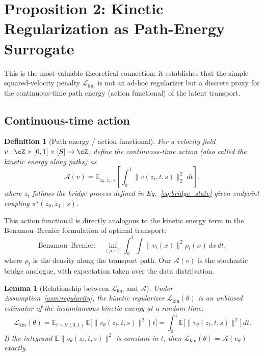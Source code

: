 \documentclass[letterpaper]{article}
\newtheorem{lemma}[proposition]{Lemma}
\newtheorem{definition}[proposition]{Definition}
\newcommand{\E}{\mathbb{E}}
\newcommand{\cA}{\mathcal{A}}
\newcommand{\cL}{\mathcal{L}}
\begin{document}
\section{Proposition 2: Kinetic Regularization as Path-Energy Surrogate}

This is the most valuable theoretical connection: it establishes that
the simple squared-velocity penalty $ \cL_{\text{kin}}$ is not an ad-hoc
regularizer but a discrete proxy for the continuous-time path energy
(action functional) of the latent transport.

\subsection{Continuous-time action}

\begin{definition}[Path energy / action functional]
\label{def:action}
For a velocity field $v : \cZ \times [0,1] \times [S] \to \cZ$, define the
continuous-time action (also called the kinetic energy along paths) as
\begin{equation}
    \cA(v) = \E_{z_0, \tilde z_1, s} \left[
        \int_0^1 \bigl\| v(z_t, t, s) \bigr\|_2^2 \; dt
    \right],
    \label{eq:continuous_action}
\end{equation}
where $z_t$ follows the bridge process defined in Eq.~\eqref{eq:bridge_state}
given endpoint coupling $\pi^\star(z_0, \tilde z_1 \mid s)$.
\end{definition}

This action functional is directly analogous to the kinetic energy term
in the Benamou--Brenier formulation of optimal transport:
\begin{equation}
    \text{Benamou--Brenier:} \quad
    \inf_{(\rho, v)} \int_0^1 \int \|v_t(x)\|^2 \rho_t(x) \, dx \, dt,
\end{equation}
where $\rho_t$ is the density along the transport path. Our $\cA(v)$ is
the stochastic bridge analogue, with expectation taken over the data
distribution.

\begin{lemma}[Relationship between $\cL_{\text{kin}}$ and $\cA$]
\label{lem:kinetic_to_action}
Under Assumption~\ref{asm:regularity},
the kinetic regularizer $\cL_{\text{kin}}(\theta)$ is an unbiased estimator
of the instantaneous kinetic energy at a random time:
\begin{equation}
    \cL_{\text{kin}}(\theta) = \E_{t \sim \mathcal{U}(0,1)}\,
        \E\bigl[ \|v_\theta(z_t, t, s)\|^2 \mid t \bigr]
    = \int_0^1 \E\bigl[ \|v_\theta(z_t, t, s)\|^2 \bigr] \, dt.
    \label{eq:kinetic_as_integral}
\end{equation}
If the integrand $\E\|v_\theta(z_t, t, s)\|^2$ is constant in $t$,
then $\cL_{\text{kin}}(\theta) = \cA(v_\theta)$ exactly.
\end{lemma}
\end{document}
